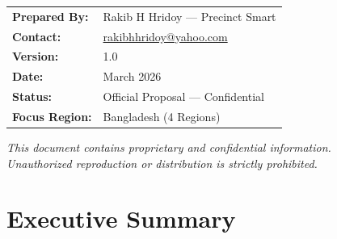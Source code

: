 \begin{titlepage}
\begin{center}
        \vspace{1.8cm}

        \begin{tcolorbox}[enhanced, colback=LightGrey, colframe=MidGrey,
            arc=6pt, boxrule=0.8pt, width=0.78\textwidth,
            left=14pt, right=14pt, top=10pt, bottom=10pt]
            \renewcommand{\arraystretch}{1.4}
            \begin{tabular}{@{}ll@{}}
                \textcolor{HeaderGrey}{\textbf{Prepared By:}}   & Rakib H Hridoy --- Precinct Smart \\
                \textcolor{HeaderGrey}{\textbf{Contact:}}       & \href{mailto:rakibhhridoy@yahoo.com}{\textcolor{SecondaryBlue}{rakibhhridoy@yahoo.com}} \\
                \textcolor{HeaderGrey}{\textbf{Version:}}       & 1.0 \\
                \textcolor{HeaderGrey}{\textbf{Date:}}          & March 2026 \\
                \textcolor{HeaderGrey}{\textbf{Status:}}        & Official Proposal --- Confidential \\
                \textcolor{HeaderGrey}{\textbf{Focus Region:}}  & Bangladesh (4 Regions) \\
            \end{tabular}
        \end{tcolorbox}

        \vfill

        {\footnotesize\textcolor{HeaderGrey}{
            \textit{This document contains proprietary and confidential information.}\\
            \textit{Unauthorized reproduction or distribution is strictly prohibited.}
        }}

        \vspace{1cm}

    \end{center}
\end{titlepage}



\cleardoublepage

\chapter*{Executive Summary}

